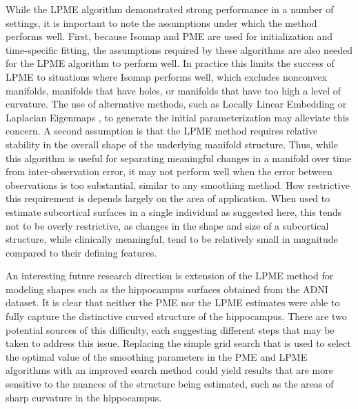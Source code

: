 \documentclass[12pt]{article}
\theoremstyle{definition}
\begin{document}
While the LPME algorithm demonstrated strong performance in a number of settings, it is important to note the assumptions under which the method performs well. First, because Isomap and PME are used for initialization and time-specific fitting, the assumptions required by these algorithms are also needed for the LPME algorithm to perform well. In practice this limits the success of LPME to situations where Isomap performs well, which excludes nonconvex manifolds, manifolds that have holes, or manifolds that have too high a level of curvature. The use of alternative methods, such as Locally Linear Embedding \citep{roweisNonlinearDimensionalityReduction2000} or Laplacian Eigenmaps \citep{belkin2003laplacian}, to generate the initial parameterization may alleviate this concern. A second assumption is that the LPME method requires relative stability in the overall shape of the underlying manifold structure. Thus, while this algorithm is useful for separating meaningful changes in a manifold over time from inter-observation error, it may not perform well when the error between observations is too substantial, similar to any smoothing method. How restrictive this requirement is depends largely on the area of application. When used to estimate subcortical surfaces in a single individual as suggested here, this tends not to be overly restrictive, as changes in the shape and size of a subcortical structure, while clinically meaningful, tend to be relatively small in magnitude compared to their defining features.

An interesting future research direction is extension of the LPME method for modeling  shapes such as the hippocampus surfaces obtained from the ADNI dataset. It is clear that neither the PME nor the LPME estimates were able to fully capture the distinctive curved structure of the hippocampus. There are two potential sources of this difficulty, each suggesting different steps that may be taken to address this issue. Replacing the simple grid search that is used to select the optimal value of the smoothing parameters in the PME and LPME algorithms with an improved search method could yield results that are more sensitive to the nuances of the structure being estimated, such as the areas of sharp curvature in the hippocampus.
\end{document}
